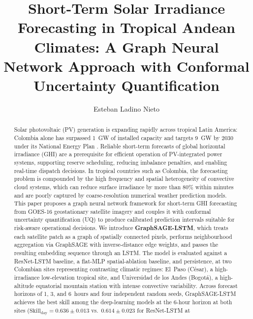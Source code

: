 \documentclass[review]{elsarticle}
\newcommand{\skillday}{\text{Skill}_\text{day}}
\begin{document}
\begin{frontmatter}

\title{Short-Term Solar Irradiance Forecasting in Tropical Andean Climates: A Graph Neural Network Approach with Conformal Uncertainty Quantification}

\author[uniandes]{Esteban Ladino Nieto}


\begin{abstract}
Solar photovoltaic (PV) generation is expanding rapidly across tropical Latin
America: Colombia alone has surpassed 1~GW of installed capacity and targets
9~GW by 2030 under its National Energy Plan \cite{upme2023}. Reliable
short-term forecasts of global horizontal irradiance (GHI) are a prerequisite
for efficient operation of PV-integrated power systems, supporting reserve
scheduling, reducing imbalance penalties, and enabling real-time dispatch
decisions. In tropical countries such as Colombia, the forecasting problem is
compounded by the high frequency and spatial heterogeneity of convective cloud
systems, which can reduce surface irradiance by more than 80\% within minutes
and are poorly captured by coarse-resolution numerical weather prediction
models. This paper proposes a graph neural network framework for short-term
GHI forecasting from GOES-16 geostationary satellite imagery and couples it
with conformal uncertainty quantification (UQ) to produce calibrated
prediction intervals suitable for risk-aware operational decisions. We
introduce \textbf{GraphSAGE-LSTM}, which treats each satellite patch as a
graph of spatially connected pixels, performs neighbourhood aggregation via
GraphSAGE with inverse-distance edge weights, and passes the resulting
embedding sequence through an LSTM. The model is evaluated against a
ResNet-LSTM baseline, a flat-MLP spatial-ablation baseline, and persistence,
at two Colombian sites representing contrasting climatic regimes: El~Paso
(C{\'e}sar), a high-irradiance low-elevation tropical site, and Universidad de
los Andes (Bogot{\'a}), a high-altitude equatorial mountain station with
intense convective variability. Across forecast horizons of 1, 3, and 6~hours
and four independent random seeds, GraphSAGE-LSTM achieves the best skill
among the deep-learning models at the 6-hour horizon at both sites
($\skillday = 0.636 \pm 0.013$ vs.\ $0.614 \pm 0.023$ for ResNet-LSTM at

\end{abstract}
\end{frontmatter}
\end{document}
